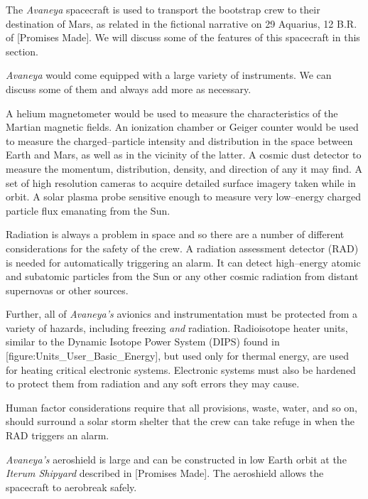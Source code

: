 

The {\it Avaneya} spacecraft is used to transport the bootstrap crew to their destination of Mars, as related in the fictional narrative on 29 Aquarius, 12 B.R. of [Promises Made]. We will discuss some of the features of this spacecraft in this section.

{\it Avaneya} would come equipped with a large variety of instruments. We can discuss some of them and always add more as necessary.

A helium magnetometer would be used to measure the characteristics of the Martian magnetic fields. An ionization chamber or Geiger counter would be used to measure the charged--particle intensity and distribution in the space between Earth and Mars, as well as in the vicinity of the latter. A cosmic dust detector to measure the momentum, distribution, density, and direction of any it may find. A set of high resolution cameras to acquire detailed surface imagery taken while in orbit. A solar plasma probe sensitive enough to measure very low--energy charged particle flux emanating from the Sun.

Radiation is always a problem in space and so there are a number of different considerations for the safety of the crew. A radiation assessment detector (RAD) is needed for automatically triggering an alarm. It can detect high--energy atomic and subatomic particles from the Sun or any other cosmic radiation from distant supernovas or other sources. 

Further, all of {\it Avaneya's} avionics and instrumentation must be protected from a variety of hazards, including freezing {\it and} radiation. Radioisotope heater units, similar to the Dynamic Isotope Power System (DIPS) found in [figure:Units_User_Basic_Energy], but used only for thermal energy, are used for heating critical electronic systems. Electronic systems must also be hardened to protect them from radiation and any soft errors they may cause.

Human factor considerations require that all provisions, waste, water, and so on, should surround a solar storm shelter that the crew can take refuge in when the RAD triggers an alarm.

{\it Avaneya's} aeroshield is large and can be constructed in low Earth orbit at the {\it Iterum Shipyard} described in [Promises Made]. The aeroshield allows the spacecraft to aerobreak safely.

